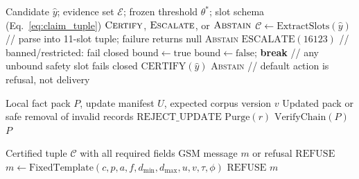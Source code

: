 \documentclass[11pt,a4paper]{article}
\begin{document}
\begin{algorithm}[t]
\caption{Fail-Closed Typed Relational Verification}
\label{alg:verifier}
\begin{algorithmic}[1]
\REQUIRE Candidate $\hat{y}$; evidence set $\mathcal{E}$; frozen threshold $\theta^*$; slot schema (Eq.~\ref{eq:claim_tuple})
\ENSURE $\textsc{Certify}$, $\textsc{Escalate}$, or $\textsc{Abstain}$
\STATE $\mathcal{C} \gets \mathrm{ExtractSlots}(\hat{y})$ \hfill // parse into 11-slot tuple; failure returns null
    \RETURN \textsc{Abstain}
\ENDIF
{}
    \RETURN $\mathrm{ESCALATE}(16123)$ \hfill // banned/restricted: fail closed
\ENDIF
\STATE $\text{bound} \gets \mathrm{true}$
        \STATE $\text{bound} \gets \mathrm{false}$; \textbf{break} \hfill // any unbound safety slot fails closed
    \ENDIF
\ENDFOR
{}
    \RETURN $\mathrm{CERTIFY}(\hat{y})$
\ELSE
    \RETURN \textsc{Abstain} \hfill // default action is refusal, not delivery
\ENDIF
\end{algorithmic}
\end{algorithm}

\begin{algorithm}[t]
\caption{Hash-Chained Cache Invalidation}
\label{alg:cache}
\begin{algorithmic}[1]
\REQUIRE Local fact pack $P$, update manifest $U$, expected corpus version $v$
\ENSURE Updated pack or safe removal of invalid records
    \RETURN $\mathrm{REJECT\_UPDATE}$
\ENDIF
{}
        \STATE $\mathrm{Purge}(r)$
    \ENDIF
\ENDFOR
\STATE $\mathrm{VerifyChain}(P)$
\RETURN $P$
\end{algorithmic}
\end{algorithm}

\begin{algorithm}[t]
\caption{Deterministic GSM-160 Composition}
\label{alg:sms}
\begin{algorithmic}[1]
\REQUIRE Certified tuple $\mathcal{C}$ with all required fields
\ENSURE GSM message $m$ or refusal
    \RETURN $\mathrm{REFUSE}$
\ENDIF
\STATE $m \gets \mathrm{FixedTemplate}(c,p,a,f,d_{\min},d_{\max},u,v,\tau,\phi)$
    \RETURN $\mathrm{REFUSE}$
\ENDIF
\RETURN $m$
\end{algorithmic}
\end{algorithm}
\end{document}
